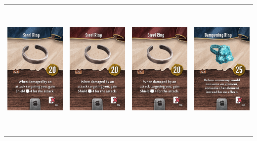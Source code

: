 \documentclass{minimal}
\begin{document}
{\begin{longtable}{llll}
\includegraphics[width=44mm,height=68mm]{./64-151/gh-091a-steel-ring.png} &
\includegraphics[width=44mm,height=68mm]{./64-151/gh-091b-steel-ring.png} &
\includegraphics[width=44mm,height=68mm]{./64-151/gh-091b-steel-ring.png} &
\includegraphics[width=44mm,height=68mm]{./64-151/gh-092a-dampening-ring.png}\\ 

\end{longtable}}
\end{document}
